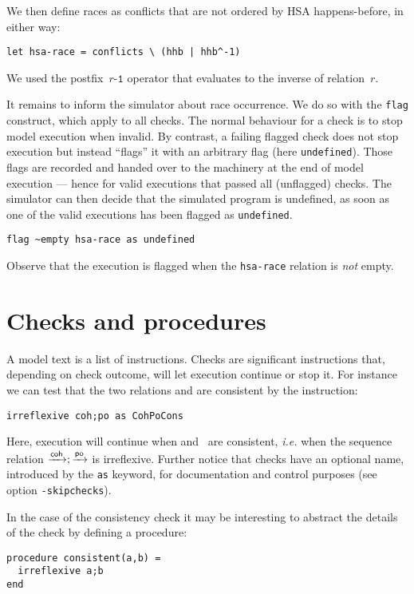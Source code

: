\documentclass[a4paper]{article}
\begin{document}
We then define races as conflicts that are not ordered by HSA happens-before,
in either way:
\begin{verbatim}
let hsa-race = conflicts \ (hhb | hhb^-1)
\end{verbatim}
We used the postfix~$r\texttt{\^{}-1}$ operator that evaluates to
the inverse of relation~$r$.

It remains to inform the \herd{} simulator about race occurrence.
We do so with the \texttt{flag} construct, which apply to all checks.
The normal behaviour for a check is to stop model execution when invalid.
By contrast, a failing flagged check
does not stop execution but instead ``flags'' it with an arbitrary flag
(here \verb+undefined+).
Those flags are recorded and handed over to the  machinery
at the end of model execution --- hence for valid executions that passed
all (unflagged) checks.
The simulator \herd{} can then decide that the simulated program is undefined,
as soon as one of the valid executions has been flagged as \verb+undefined+.
\begin{verbatim}
flag ~empty hsa-race as undefined
\end{verbatim}
Observe that the execution is flagged when the \verb+hsa-race+ relation is
\emph{not} empty.


\appendix
\section{\label{procedure}Checks and procedures}
A model text is a list of instructions.
Checks are significant instructions that, depending on check outcome,
will let execution continue or stop it.
For instance we can test that the two relations
\coh{} and \po{} are consistent by the instruction:
\begin{verbatim}
irreflexive coh;po as CohPoCons
\end{verbatim}
Here, execution will continue when \coh{} and~\po{} are consistent,
\emph{i.e.} when the sequence relation $\xrightarrow{\textsf{\scriptsize{}coh}}; \xrightarrow{\textsf{\scriptsize{}po}}$ is irreflexive.
Further notice that checks have an optional name, introduced by the \texttt{as}
keyword, for documentation and control purposes (see \herd{} option \texttt{-skipchecks}).

In the case of the consistency check it may be interesting to abstract the
details of the check by defining a procedure:
\begin{verbatim}
procedure consistent(a,b) =
  irreflexive a;b
end
\end{verbatim}
\end{document}
